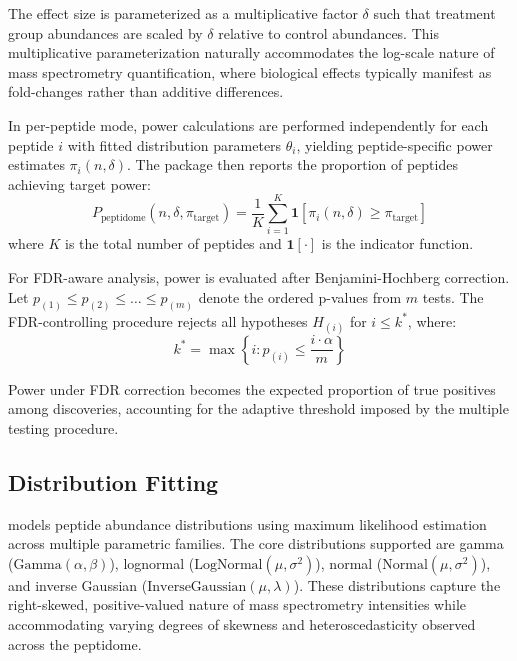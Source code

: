\documentclass[article]{jss}
\begin{document}
The effect size is parameterized as a multiplicative factor $\delta$ such that treatment group abundances are scaled by $\delta$ relative to control abundances. This multiplicative parameterization naturally accommodates the log-scale nature of mass spectrometry quantification, where biological effects typically manifest as fold-changes rather than additive differences.

In per-peptide mode, power calculations are performed independently for each peptide $i$ with fitted distribution parameters $\theta_i$, yielding peptide-specific power estimates $\pi_i(n, \delta)$. The package then reports the proportion of peptides achieving target power:
\begin{equation}
P_{\text{peptidome}}(n, \delta, \pi_{\text{target}}) = \frac{1}{K}\sum_{i=1}^{K} \mathbf{1}[\pi_i(n, \delta) \geq \pi_{\text{target}}]
\end{equation}
where $K$ is the total number of peptides and $\mathbf{1}[\cdot]$ is the indicator function.

For FDR-aware analysis, power is evaluated after Benjamini-Hochberg correction. Let $p_{(1)} \leq p_{(2)} \leq \ldots \leq p_{(m)}$ denote the ordered p-values from $m$ tests. The FDR-controlling procedure rejects all hypotheses $H_{(i)}$ for $i \leq k^*$, where:
\begin{equation}
k^* = \max\left\{i : p_{(i)} \leq \frac{i \cdot \alpha}{m}\right\}
\end{equation}

Power under FDR correction becomes the expected proportion of true positives among discoveries, accounting for the adaptive threshold imposed by the multiple testing procedure.

\subsection{Distribution Fitting}

 models peptide abundance distributions using maximum likelihood estimation across multiple parametric families. The core distributions supported are gamma ($\text{Gamma}(\alpha, \beta)$), lognormal ($\text{LogNormal}(\mu, \sigma^2)$), normal ($\text{Normal}(\mu, \sigma^2)$), and inverse Gaussian ($\text{InverseGaussian}(\mu, \lambda)$). These distributions capture the right-skewed, positive-valued nature of mass spectrometry intensities while accommodating varying degrees of skewness and heteroscedasticity observed across the peptidome.
\end{document}
